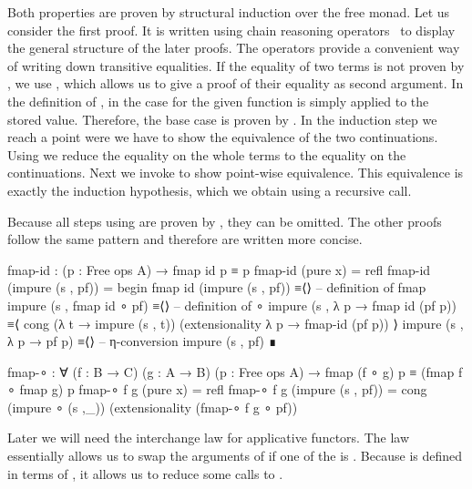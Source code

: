 Both properties are proven by structural induction over the free monad.
Let us consider the first proof.
It is written using chain reasoning operators~\cite{norell:thesis} to display
the general structure of the later proofs.
The operators provide a convenient way of writing down transitive equalities.
If the equality of two terms is not proven by ,
we use , which allows us to give a proof of their
equality as second argument.
In the definition of \AgdaFunction{<\$>}, in the case for
 the given function is simply applied to the
stored value.
Therefore, the base case is proven by .
In the induction step we reach a point were we have to show the equivalence of
the two continuations.
Using  we reduce the equality on the whole terms to the
equality on the continuations.
Next we invoke  to show point-wise equivalence.
This equivalence is exactly the induction hypothesis, which we obtain using a
recursive call.

Because all steps using  are proven by
, they can be omitted.
The other proofs follow the same pattern and therefore are written more concise.

\begin{code}[number=fmap-id]
fmap-id : (p : Free ops A) → fmap id p ≡ p
fmap-id (pure x)           = refl
fmap-id (impure (s , pf))  = begin
  fmap id (impure (s , pf))          ≡⟨⟩ -- definition of fmap
  impure (s , fmap id ∘ pf)          ≡⟨⟩ -- definition of ∘
  impure (s , λ p → fmap id (pf p))  ≡⟨ cong (λ t → impure (s , t))
                                         (extensionality λ p → fmap-id (pf p)) ⟩
  impure (s , λ p → pf p)            ≡⟨⟩ -- η-conversion
  impure (s , pf)                    ∎
\end{code}
\begin{code}[number=fmap-comp]
fmap-∘ : ∀ (f : B → C) (g : A → B) (p : Free ops A) →
  fmap (f ∘ g) p ≡ (fmap f ∘ fmap g) p
fmap-∘ f g (pure x)           = refl
fmap-∘ f g (impure (s , pf))  = cong (impure ∘ (s ,_)) (extensionality (fmap-∘ f g ∘ pf))
\end{code}
Later we will need the interchange law for applicative functors.
The law essentially allows us to swap the arguments of \AgdaFunction{<*>} if one
of the is .
Because \AgdaFunction{<*>} is defined in terms of \AgdaFunction{<\$>}, it allows
us to reduce some \AgdaFunction{<*>} calls to \AgdaFunction{<\$>}.

